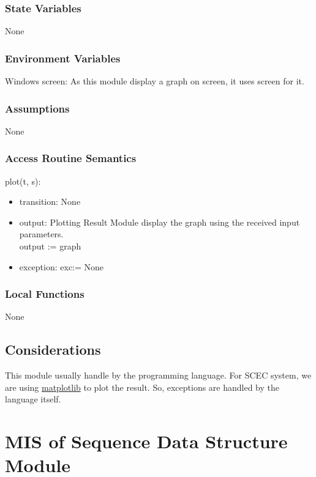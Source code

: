 \documentclass[12pt, titlepage]{article}
\begin{document}
\subsubsection{State Variables}

None

\subsubsection{Environment Variables}

Windows screen: As this module display a graph on screen, it uses screen for it. 

\subsubsection{Assumptions}

None

\subsubsection{Access Routine Semantics}

\noindent plot(t, s):
\begin{itemize}
\item transition: None
\item output: Plotting Result Module display the graph using the received input parameters. \\ 
output := graph
\item exception: exc:= 
None
\end{itemize}


\subsubsection{Local Functions}

None

\subsection{Considerations}

This module usually handle by the programming language. For SCEC system, we are using \href{https://matplotlib.org/stable/tutorials/introductory/pyplot.html}{matplotlib} to plot the result. So, exceptions are handled by the language itself. 

\newpage
\section{MIS of Sequence Data Structure Module} \label{Sequence_Data_Structure_Module} 
 
\end{document}
